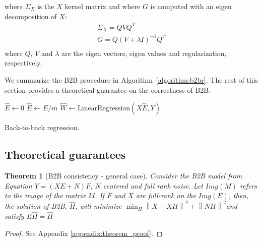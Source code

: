 \documentclass[preprint,12pt,3p]{elsarticle}
\newtheorem{theorem}{Theorem}
\begin{document}
where $\Sigma_X$ is the $X$ kernel matrix and where $G$ is computed with an
eigen decomposition of $X$:
\begin{equation}
  \begin{aligned}
  \Sigma_X = Q V Q^T \\
  G = Q (V + \lambda I)^{-1} Q^T\\
  \end{aligned}
\end{equation}
where $Q$, $V$ and $\lambda$ are the eigen vectors, eigen values and
regularization, respectively.

%

We summarize the B2B procedure in Algorithm~\ref{algorithm:b2br}.
%
The rest of this section provides a theoretical guarantee on the correctness of
B2B.


\begin{algorithm}[H]
    $\hat{E} \leftarrow 0$\;
    $\hat{E} \leftarrow \hat{E} / m$\;
    $\hat{W} \leftarrow \text{LinearRegression}(X \hat{E}, Y)$\;
    \caption{Back-to-back regression.}
    \label{algorithm:b2br}
\end{algorithm}

\subsection{Theoretical guarantees}
\label{sec:theorem}

\begin{theorem}[B2B consistency - general case]

     Consider the B2B model from Equation $Y = (XE + N)F$, $N$ centered and full
     rank noise.
     Let $Img(M)$ refers to the image of the matrix $M$. If $F$ and $X$ are
     full-rank on the $Img(E)$, then, the solution of B2B, $\hat H$, will
     minimize
     $\min_H  \left \| X - XH\right\| ^2  + \left \| NH\right \| ^2$and satisfy $E\hat H = \hat H$
\end{theorem}
%
\begin{proof}
  See Appendix \ref{appendix:theorem_proof}.
\end{proof}
\end{document}
